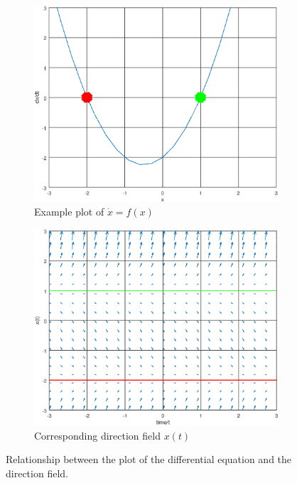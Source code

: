  \begin{figure}
	\centering
	\begin{subfigure}[h]{0.45\linewidth}
		\includegraphics[width=\linewidth]{images/xPrime_x.png}
		\caption{Example plot of $\dot{x} = f(x)$}
		\label{fig:xPrime_x}
	\end{subfigure}
	\begin{subfigure}[h]{0.45\linewidth}
		\includegraphics[width=\linewidth]{images/x_t_quiver.png}
		\caption{Corresponding direction field $x(t)$}
		\label{fig:x_t_quiver}
	\end{subfigure}
	\caption{Relationship between the plot of the differential equation and the direction field.}
\end{figure}

